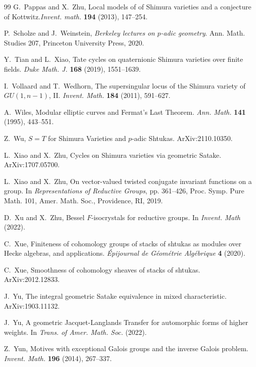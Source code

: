 \documentclass[11pt]{amsart}
\theoremstyle{definition}
\theoremstyle{definition}
\theoremstyle{definition}
\numberwithin{equation}{section}
\begin{document}
\begin{thebibliography}{99}
G.~Pappas and X.~Zhu, Local models of of Shimura varieties and a conjecture of Kottwitz.\emph{Invent. math.} \textbf{194} (2013), 147--254.

P.~Scholze and J.~Weinstein, \emph{Berkeley lectures on $p$-adic geometry}. Ann. Math. Studies 207, Princeton University Press, 2020.

Y.~Tian and L.~Xiao, Tate cycles on quaternionic Shimura varieties over finite fields. \emph{Duke Math. J.} \textbf{168} (2019), 1551--1639.

I.~Vollaard and T.~Wedhorn, The supersingular locus of the Shimura variety of $GU(1,n-1)$, II. \emph{Invent. Math.} \textbf{184} (2011), 591--627.

A.~Wiles, Modular elliptic curves and Fermat's Last Theorem. \emph{Ann. Math.} \textbf{141} (1995), 443--551.

Z.~Wu, $S=T$ for Shimura Varieties and $p$-adic Shtukas. ArXiv:2110.10350.

L.~Xiao and X.~Zhu, Cycles on Shimura varieties via geometric Satake. ArXiv:1707.05700.

L.~Xiao and X.~Zhu, On vector-valued twisted conjugate invariant functions on a group. In \emph{Representations of Reductive Groups}, pp. 361--426, Proc. Symp. Pure Math. 101, Amer. Math. Soc., Providence, RI, 2019.

D.~Xu and X.~Zhu, Bessel $F$-isocrystals for reductive groups. In \emph{Invent. Math} (2022).

C.~Xue, Finiteness of cohomology groups of stacks of shtukas as modules over Hecke algebras, and applications. \emph{\'Epijournal de G\'eom\'etrie Alg\'ebrique} \textbf{4} (2020).

C.~Xue, Smoothness of cohomology sheaves of stacks of shtukas. ArXiv:2012.12833.

J.~Yu, The integral geometric Satake equivalence in mixed characteristic. ArXiv:1903.11132.

J.~Yu, A geometric Jacquet-Langlands Transfer for automorphic forms of higher weights. In \emph{Trans. of Amer. Math. Soc.} (2022).

Z.~Yun, Motives with exceptional Galois groups and the inverse Galois problem. \emph{Invent. Math.} \textbf{196} (2014), 267--337. 


\end{thebibliography}
\end{document}
